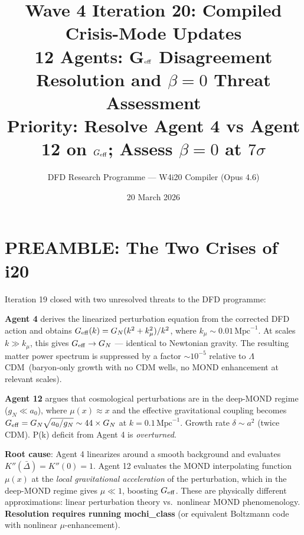 \documentclass[11pt]{article}
\title{\textbf{Wave 4 Iteration 20: Compiled Crisis-Mode Updates}\\[8pt]
{\large 12 Agents: G$_{\rm eff}$ Disagreement Resolution and $\beta=0$ Threat Assessment}\\[4pt]
{\normalsize Priority: Resolve Agent 4 vs Agent 12 on $\Geff$; Assess $\beta=0$ at $7\sigma$}}
\author{DFD Research Programme --- W4i20 Compiler (Opus 4.6)}
\date{20 March 2026}
\newcommand{\Geff}{G_{\rm eff}}
\newcommand{\kmu}{k_\mu}
\newcommand{\LCDM}{$\Lambda$CDM}
\newcommand{\azero}{a_0}
\theoremstyle{remark}
\begin{document}
\maketitle
\tableofcontents
\newpage

\section*{PREAMBLE: The Two Crises of i20}

Iteration 19 closed with two unresolved threats to the DFD programme:

\begin{crisisbox}[CRISIS A: $\Geff$ Disagreement]
\textbf{Agent 4} derives the linearized perturbation equation from the corrected DFD action
and obtains $\Geff(k) = G_N (k^2 + \kmu^2)/k^2$, where $\kmu \sim 0.01\,\text{Mpc}^{-1}$.
At scales $k \gg \kmu$, this gives $\Geff \to G_N$ --- identical to Newtonian gravity.
The resulting matter power spectrum is suppressed by a factor $\sim 10^{-5}$ relative to
\LCDM\ (baryon-only growth with no CDM wells, no MOND enhancement at relevant scales).

\textbf{Agent 12} argues that cosmological perturbations are in the deep-MOND regime
($g_N \ll \azero$), where $\mu(x) \approx x$ and the effective gravitational coupling
becomes $\Geff = G_N \sqrt{\azero/g_N} \sim 44 \times G_N$ at $k = 0.1\,\text{Mpc}^{-1}$.
Growth rate $\delta \sim a^2$ (twice CDM). P(k) deficit from Agent 4 is
\emph{overturned}.

\textbf{Root cause}: Agent 4 linearizes around a smooth background and evaluates
$K''(\bar\Delta) = K''(0) = 1$. Agent 12 evaluates the MOND interpolating function
$\mu(x)$ at the \emph{local gravitational acceleration} of the perturbation, which in
the deep-MOND regime gives $\mu \ll 1$, boosting $\Geff$. These are physically
different approximations: linear perturbation theory vs.\ nonlinear MOND phenomenology.
\textbf{Resolution requires running mochi\_class} (or equivalent Boltzmann code with
nonlinear $\mu$-enhancement).
\end{crisisbox}
\end{document}
